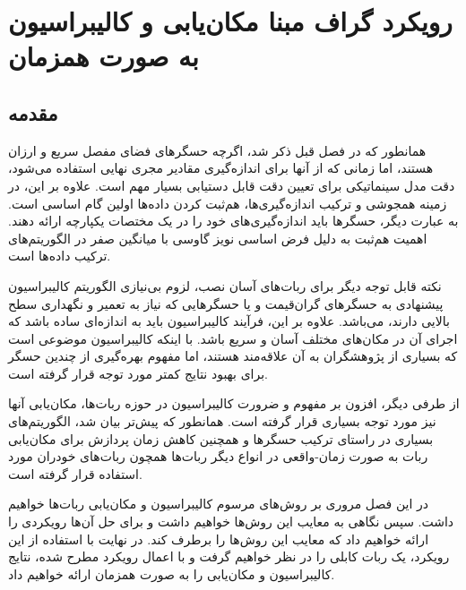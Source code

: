 \chapter{رویکرد گراف مبنا مکان‌یابی و کالیبراسیون به صورت همزمان}

\section{مقدمه}
همانطور که در فصل قبل ذکر شد، اگرچه حسگرهای فضای مفصل سریع و ارزان هستند، اما زمانی که از آنها برای اندازه‌گیری مقادیر مجری نهایی استفاده می‌شود، دقت مدل سینماتیکی برای تعیین دقت قابل دستیابی بسیار مهم است. علاوه بر این، در زمینه همجوشی و ترکیب اندازه‌گیری‌ها، هم‌ثبت کردن داده‌ها
\cite{hall1997introduction} 
 اولین گام اساسی است. به عبارت دیگر، حسگرها باید اندازه‌گیری‌های خود را در یک مختصات یکپارچه ارائه دهند. اهمیت هم‌ثبت به دلیل فرض اساسی نویز گاوسی با میانگین صفر در الگوریتم‌های ترکیب داده‌ها است.
 
 نکته قابل توجه دیگر برای ربات‌های آسان نصب، لزوم بی‌نیازی الگوریتم کالیبراسیون پیشنهادی به حسگرهای گران‌قیمت و یا حسگرهایی که نیاز به تعمیر و نگهداری سطح بالایی دارند، می‌باشد. علاوه بر این، فرآیند کالیبراسیون باید به اندازه‌ای ساده باشد که اجرای آن در مکان‌های مختلف آسان و سریع باشد. با اینکه کالیبراسیون موضوعی است که بسیاری از پژوهشگران به آن علاقه‌مند هستند، اما مفهوم بهره‌گیری از چندین حسگر برای بهبود نتایج کمتر مورد توجه قرار گرفته است.
 

از طرفی دیگر، افزون بر مفهوم و ضرورت کالیبراسیون در حوزه ربات‌ها، مکان‌یابی آنها نیز مورد توجه بسیاری قرار گرفته است. همانطور که پیش‌تر بیان شد، الگوریتم‌های بسیاری در راستای ترکیب حسگرها و همچنین کاهش زمان پردازش برای مکان‌یابی ربات به صورت زمان-واقعی در انواع دیگر ربات‌ها همچون ربات‌های خودران مورد استفاده قرار گرفته است.

در این فصل مروری بر روش‌های مرسوم کالیبراسیون و مکان‌یابی ربات‌ها خواهیم داشت. سپس نگاهی به معایب این روش‌ها خواهیم داشت و برای حل آن‌ها رویکردی را ارائه خواهیم داد که معایب این روش‌ها را برطرف کند. در نهایت با استفاده از این رویکرد، یک ربات کابلی را در نظر خواهیم گرفت و با اعمال رویکرد مطرح شده، نتایج کالیبراسیون و مکان‌یابی را به صورت همزمان ارائه خواهیم داد.


